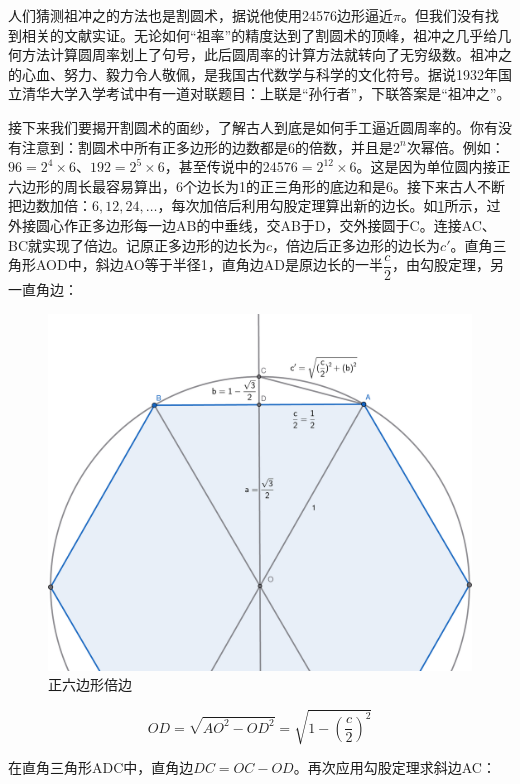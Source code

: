 \documentclass[b5paper]{ctexart}
\begin{document}
人们猜测祖冲之的方法也是割圆术，据说他使用24576边形逼近$\pi$。但我们没有找到相关的文献实证。无论如何“祖率”的精度达到了割圆术的顶峰，祖冲之几乎给几何方法计算圆周率划上了句号，此后圆周率的计算方法就转向了无穷级数。祖冲之的心血、努力、毅力令人敬佩，是我国古代数学与科学的文化符号。据说1932年国立清华大学入学考试中有一道对联题目：上联是“孙行者”，下联答案是“祖冲之”\cite{BaiHuawen-2018}。

接下来我们要揭开割圆术的面纱，了解古人到底是如何手工逼近圆周率的。你有没有注意到：割圆术中所有正多边形的边数都是6的倍数，并且是$2^n$次幂倍。例如：$96 = 2^4 \times 6$、$192 = 2^5 \times 6$，甚至传说中的$24576 = 2^{12} \times 6$。这是因为单位圆内接正六边形的周长最容易算出，6个边长为1的正三角形的底边和是6。接下来古人不断把边数加倍：$6, 12, 24, \dotsc$，每次加倍后利用勾股定理算出新的边长。如\cref{fig:double-edges}所示，过外接圆心作正多边形每一边AB的中垂线，交AB于D，交外接圆于C。连接AC、BC就实现了倍边。记原正多边形的边长为$c$，倍边后正多边形的边长为$c'$。直角三角形AOD中，斜边AO等于半径1，直角边AD是原边长的一半$\dfrac{c}{2}$，由勾股定理，另一直角边：

\begin{figure}[htbp]
 \centering
 \includegraphics[scale=0.35]{img/double-edges}
 \caption{正六边形倍边}
 \label{fig:double-edges}
\end{figure}

\[
OD = \sqrt{AO^2 - OD^2} = \sqrt{1 - (\frac{c}{2})^2}
\]

在直角三角形ADC中，直角边$DC = OC - OD$。再次应用勾股定理求斜边AC：
\end{document}
